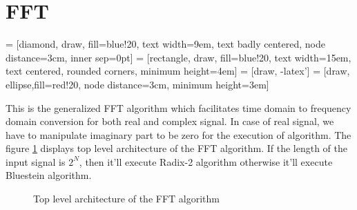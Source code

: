%
%
\clearpage
\section{FFT}

 = [diamond, draw, fill=blue!20, 
text width=9em, text badly centered, node distance=3cm, inner sep=0pt]
 = [rectangle, draw, fill=blue!20, 
text width=15em, text centered, rounded corners, minimum height=4em]
 = [draw, -latex']
 = [draw, ellipse,fill=red!20, node distance=3cm,
minimum height=3em]


This is the generalized FFT algorithm which facilitates time domain to frequency domain conversion for both real and complex signal. In case of real signal, we have to manipulate imaginary part to be zero for the execution of algorithm.
The figure \ref{Top_level_FFT } displays top level architecture of the FFT algorithm.  If the length of the input signal is $2^N$, then it'll execute Radix-2 algorithm otherwise it'll execute Bluestein algorithm.

\begin{center}
\begin{figure}[ht]

\begin{center}
\end{center}
\vspace{0.5cm}
\caption{Top level architecture of the FFT algorithm}
\label{Top_level_FFT }
\end{figure}
\end{center}

